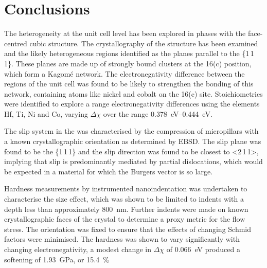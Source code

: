 \section{Conclusions}


The heterogeneity at the unit cell level has been explored in phases with the face-centred cubic  structure. The crystallography of the structure has been examined and the likely heterogeneous regions identified as the planes parallel to the \{1\,1\,1\}. These planes are made up of strongly bound clusters at the 16(c) position, which form a Kagom\'{e} network. The electronegativity difference between the regions of the unit cell was found to be likely to strengthen the bonding of this network, containing atoms like nickel and cobalt on the 16(c) site. Stoichiometries were identified to explore a range electronegativity differences using the elements Hf, Ti, Ni and Co, varying $\Delta \chi$ over the range \SIrange{0.378}{0.444}{eV}.

The slip system in the  was characterised by the compression of micropillars with a known crystallographic orientation as determined by EBSD. The slip plane was found to be the \{1\,1\,1\} and the slip direction was found to be closest to <2\,1\,1>, implying that slip is predominantly mediated by partial dislocations, which would be expected in a material for which the Burgers vector is so large.

Hardness measurements by instrumented nanoindentation was undertaken to characterise the size effect, which was shown to be limited to indents with a depth less than approximately \SI{800}{\nano\meter}. Further indents were made on known crystallographic faces of the crystal to determine a proxy metric for the flow stress. The orientation was fixed to ensure that the effects of changing Schmid factors were minimised. The hardness was shown to vary significantly with changing electronegativity, a modest change in $\Delta \chi$ of \SI{0.066}{\electronvolt} produced a softening of \SI{1.93}{\giga\pascal}, or \SI{15.4}{\percent} 

